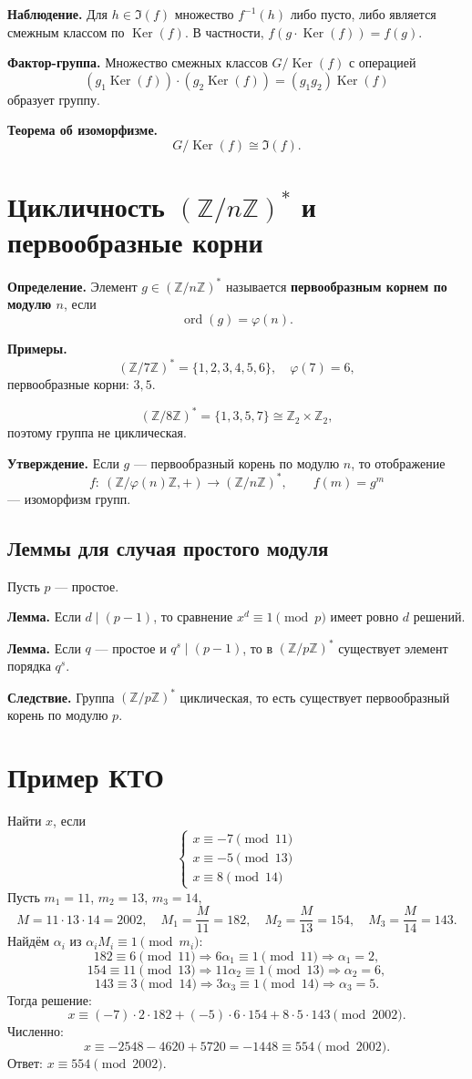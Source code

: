 \documentclass[12pt,a4paper]{article}
\newcommand{\Z}{\mathbb{Z}}
\DeclareMathOperator{\ord}{ord}
\DeclareMathOperator{\Ker}{Ker}
\begin{document}
\textbf{Наблюдение.}
Для $h\in \Im(f)$ множество $f^{-1}(h)$ либо пусто, либо является смежным классом по $\Ker(f)$.
В частности, $f(g\cdot \Ker(f))=f(g)$.

\textbf{Фактор-группа.}
Множество смежных классов $G/\Ker(f)$ с операцией
\[
(g_1\Ker(f))\cdot(g_2\Ker(f))=(g_1g_2)\Ker(f)
\]
образует группу.

\textbf{Теорема об изоморфизме.}
\[
G/\Ker(f)\cong \Im(f).
\]

\section{Цикличность $(\Z/n\Z)^{\ast}$ и первообразные корни}

\textbf{Определение.}
Элемент $g\in(\Z/n\Z)^{\ast}$ называется \textbf{первообразным корнем по модулю $n$},
если
\[
\ord(g)=\varphi(n).
\]

\textbf{Примеры.}
\[
(\Z/7\Z)^{\ast}=\{1,2,3,4,5,6\},\quad \varphi(7)=6,
\]
первообразные корни: $3,5$.

\[
(\Z/8\Z)^{\ast}=\{1,3,5,7\}\cong \Z_2\times \Z_2,
\]
поэтому группа не циклическая.

\textbf{Утверждение.}
Если $g$ — первообразный корень по модулю $n$, то отображение
\[
f:\ (\Z/\varphi(n)\Z,+)\to (\Z/n\Z)^{\ast},\qquad f(m)=g^m
\]
— изоморфизм групп.

\subsection{Леммы для случая простого модуля}

Пусть $p$ — простое.

\textbf{Лемма.}
Если $d\mid (p-1)$, то сравнение $x^d\equiv 1\pmod p$ имеет ровно $d$ решений.

\textbf{Лемма.}
Если $q$ — простое и $q^s\mid (p-1)$, то в $(\Z/p\Z)^{\ast}$ существует элемент порядка $q^s$.

\textbf{Следствие.}
Группа $(\Z/p\Z)^{\ast}$ циклическая, то есть существует первообразный корень по модулю $p$.

\section{Пример КТО}

Найти $x$, если
\[
\begin{cases}
x\equiv -7 \pmod{11}\\
x\equiv -5 \pmod{13}\\
x\equiv 8 \pmod{14}
\end{cases}
\]
Пусть $m_1=11$, $m_2=13$, $m_3=14$,
\[
M=11\cdot 13\cdot 14=2002,\quad
M_1=\frac{M}{11}=182,\quad
M_2=\frac{M}{13}=154,\quad
M_3=\frac{M}{14}=143.
\]
Найдём $\alpha_i$ из $\alpha_i M_i\equiv 1\pmod{m_i}$:
\[
182\equiv 6\pmod{11}\Rightarrow 6\alpha_1\equiv 1\pmod{11}\Rightarrow \alpha_1=2,
\]
\[
154\equiv 11\pmod{13}\Rightarrow 11\alpha_2\equiv 1\pmod{13}\Rightarrow \alpha_2=6,
\]
\[
143\equiv 3\pmod{14}\Rightarrow 3\alpha_3\equiv 1\pmod{14}\Rightarrow \alpha_3=5.
\]
Тогда решение:
\[
x\equiv (-7)\cdot 2\cdot 182 + (-5)\cdot 6\cdot 154 + 8\cdot 5\cdot 143 \pmod{2002}.
\]
Численно:
\[
x\equiv -2548-4620+5720 = -1448 \equiv 554 \pmod{2002}.
\]
Ответ: $x\equiv 554\pmod{2002}$.
\end{document}
